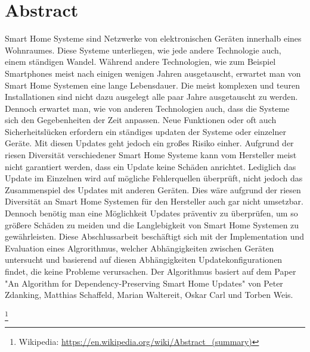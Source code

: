 \chapter*{Abstract}


Smart Home Systeme sind Netzwerke von elektronischen Geräten innerhalb eines Wohnraumes. 
Diese Systeme unterliegen, wie jede andere Technologie auch, einem ständigen Wandel. Während andere Technologien,
wie zum Beispiel Smartphones meist nach einigen wenigen Jahren ausgetauscht, erwartet man von
Smart Home Systemen eine lange Lebensdauer.
Die meist komplexen und teuren Installationen sind nicht dazu ausgelegt alle paar Jahre 
ausgetauscht zu werden. Dennoch erwartet man, wie von anderen Technologien auch, dass die Systeme
sich den Gegebenheiten der Zeit anpassen. Neue Funktionen oder oft auch Sicherheitslücken erfordern 
ein ständiges updaten der Systeme oder einzelner Geräte. Mit diesen Updates geht jedoch ein großes Risiko 
einher. Aufgrund der riesen Diversität verschiedener Smart Home Systeme kann vom Hersteller meist nicht
garantiert werden, dass ein Update keine Schäden anrichtet. Lediglich das Update im Einzelnen wird auf 
mögliche Fehlerquellen überprüft, nicht jedoch das Zusammenspiel des Updates mit anderen Geräten.
Dies wäre aufgrund der riesen Diversität an Smart Home Systemen für den Hersteller auch gar nicht umsetzbar.
Dennoch benötig man eine Möglichkeit Updates präventiv zu überprüfen, um so größere Schäden zu meiden und 
die Langlebigkeit von Smart Home Systemen zu gewährleisten.
Diese Abschlussarbeit beschäftigt sich mit der Implementation und Evaluation eines Algrorithmus, welcher 
Abhängigkeiten zwischen Geräten untersucht und basierend auf diesen Abhängigkeiten Updatekonfigurationen 
findet, die keine Probleme verursachen.
Der Algorithmus basiert auf dem Paper "An Algorithm for Dependency-Preserving 
Smart Home Updates" von Peter Zdanking, Matthias Schaffeld, Marian Waltereit, Oskar Carl und Torben Weis. 






\footnote{Wikipedia: \url{https://en.wikipedia.org/wiki/Abstract_(summary)}}


